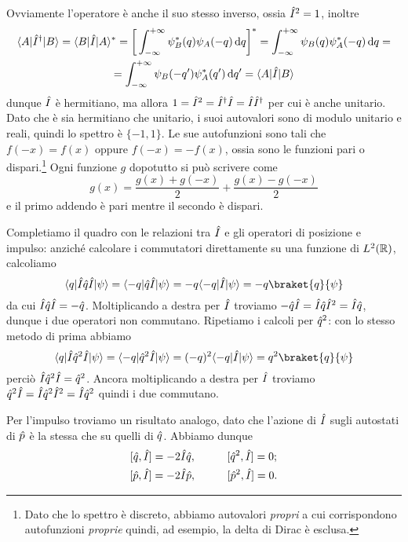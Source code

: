 Ovviamente l'operatore è anche il suo stesso inverso, ossia $\op I^2=1$, inoltre
\begin{multline}
	\bra{A}\adj{\op I}\ket{B}=\bra{B}\op I\ket{A}^*=\bigg[\int_{-\infty}^{+\infty}\psi_B^*(q)\psi_A(-q)\,\dd q\bigg]^*=\int_{-\infty}^{+\infty}\psi_B(q)\psi_A^*(-q)\,\dd q=\\
	=\int_{-\infty}^{+\infty}\psi_B(-q')\psi_A^*(q')\,\dd q'=\bra{A}\op I\ket{B}
	\label{eq:operatore-inversione-spaziale-hermitiano}
\end{multline}
dunque $\op I$ è hermitiano, ma allora $1=\op I^2=\adj{\op I}\op I=\op I\adj{\op I}$ per cui è anche unitario.
Dato che è sia hermitiano che unitario, i suoi autovalori sono di modulo unitario e reali, quindi lo spettro è $\{-1,1\}$.
Le sue autofunzioni sono tali che $f(-x)=f(x)$ oppure $f(-x)=-f(x)$, ossia sono le funzioni pari o dispari.\footnote{Dato che lo spettro è discreto, abbiamo autovalori \emph{propri} a cui corrispondono autofunzioni \emph{proprie} quindi, ad esempio, la delta di Dirac è esclusa.}
Ogni funzione $g$ dopotutto si può scrivere come
\begin{equation}
	g(x)=\frac{g(x)+g(-x)}2+\frac{g(x)-g(-x)}2
	\label{eq:decomposizione-funzione-pari-dispari}
\end{equation}
e il primo addendo è pari mentre il secondo è dispari.

Completiamo il quadro con le relazioni tra $\op I$ e gli operatori di posizione e impulso: anzich\'e calcolare i commutatori direttamente su una funzione di $\leb[2]{\R}$, calcoliamo
\begin{equation}
	\bra{q}\op I\op q\op I\ket{\psi}=\bra{-q}\op q\op I\ket{\psi}=-q\bra{-q}\op I\ket{\psi}=-q\braket{q}{\psi}
\end{equation}
da cui $\op I\op q\op I=-\op q$.
Moltiplicando a destra per $\op I$ troviamo $-\op q\op I=\op I\op q\op I^2=\op I\op q$, dunque i due operatori non commutano.
Ripetiamo i calcoli per $\op q^2$: con lo stesso metodo di prima abbiamo
\begin{equation}
	\bra{q}\op I\op q^2\op I\ket{\psi}=\bra{-q}\op q^2\op I\ket{\psi}=(-q)^2\bra{-q}\op I\ket{\psi}=q^2\braket{q}{\psi}
\end{equation}
perciò $\op I\op q^2\op I=\op q^2$.
Ancora moltiplicando a destra per $\op I$ troviamo $\op q^2\op I=\op I\op q^2\op I^2=\op I\op q^2$ quindi i due commutano.

Per l'impulso troviamo un risultato analogo, dato che l'azione di $\op I$ sugli autostati di $\op p$ è la stessa che su quelli di $\op q$.
Abbiamo dunque
\begin{equation}
	\begin{gathered}
		[\op q,\op I]=-2\op I\op q,\hspace{1cm}[\op q^2,\op I]=0;\\
		[\op p,\op I]=-2\op I\op p,\hspace{1cm}[\op p^2,\op I]=0.
	\end{gathered}
	\label{eq:commutatori-inversione-posizione-impulso}
\end{equation}
